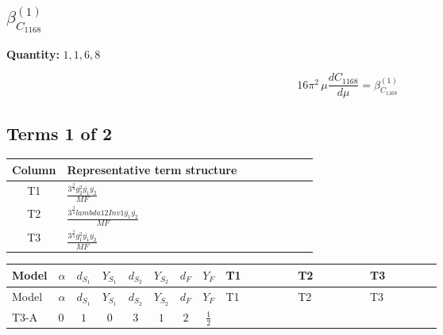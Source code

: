 \documentclass[8pt]{article}
\begin{document}
\begin{landscape}
\section*{$\beta_{C_{1168}}^{(1)}$}
\noindent\textbf{Quantity: }$\mathrm{1,1,6,8}$\par\smallskip
\[16\pi^2\,\mu\frac{d C_{1168}}{d\mu}=\beta_{C_{1168}}^{(1)}\]
\subsection*{Terms 1 of 2}
\begin{center}
\begin{tabular}{@{}c >{\raggedright\arraybackslash}p{0.82\linewidth}@{}}
\toprule
Column & Representative term structure \\
\midrule
T1 & \(\displaystyle \frac{3^{\frac{3}{4}} g_{2}^{2} \overline{y_{1}} \overline{y_{2}}}{MF}\) \\
\midrule
T2 & \(\displaystyle \frac{3^{\frac{3}{4}} lambda12Inv1 \overline{y_{1}} \overline{y_{2}}}{MF}\) \\
\midrule
T3 & \(\displaystyle \frac{3^{\frac{3}{4}} g_{1}^{2} \overline{y_{1}} \overline{y_{2}}}{MF}\) \\
\midrule
\bottomrule
\end{tabular}
\end{center}
\smallskip
\tiny
\begin{longtable}{@{}llcccccc >{\raggedright\arraybackslash}p{0.21\linewidth} >{\raggedright\arraybackslash}p{0.21\linewidth} >{\raggedright\arraybackslash}p{0.21\linewidth}@{}}
\toprule
Model & $\alpha$ & $d_{S_1}$ & $Y_{S_1}$ & $d_{S_2}$ & $Y_{S_2}$ & $d_F$ & $Y_F$ & T1 & T2 & T3 \\
\midrule
\endfirsthead
\toprule
Model & $\alpha$ & $d_{S_1}$ & $Y_{S_1}$ & $d_{S_2}$ & $Y_{S_2}$ & $d_F$ & $Y_F$ & T1 & T2 & T3 \\
\midrule
\endhead
T3-A & $0$ & $1$ & $0$ & $3$ & $1$ & $2$ & $\frac{1}{2}$ & \scriptsize\adjustbox{max width=\linewidth}{$\begin{gathered} - \frac{11 \cdot 3^{\frac{3}{4}} g_{2}^{2} \overline{y_{1}} \overline{y_{2}}}{8 MF}\end{gathered}$} & \scriptsize\adjustbox{max width=\linewidth}{$\begin{gathered} - \frac{3^{\frac{3}{4}} lambda12Inv1 \overline{y_{1}} \overline{y_{2}}}{6 MF}\end{gathered}$} & \scriptsize\adjustbox{max width=\linewidth}{$\begin{gathered} - \frac{3^{\frac{3}{4}} g_{1}^{2} \overline{y_{1}} \overline{y_{2}}}{8 MF}\end{gathered}$} \\

\end{longtable}
\end{landscape}
\end{document}
